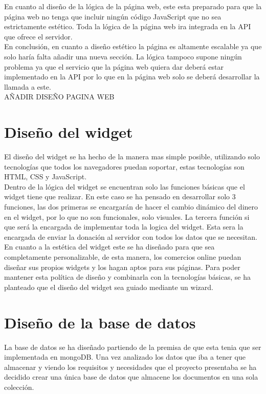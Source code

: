 En cuanto al diseño de la lógica de la página web, este esta preparado para que la página web no tenga que incluir ningún código JavaScript que no sea estrictamente estético. Toda la lógica de la página web ira integrada en la API que ofrece el servidor.\\

En conclusión, en cuanto a diseño estético la página es altamente escalable ya que solo haría falta añadir una nueva sección. La lógica tampoco supone ningún problema ya que el servicio que la página web quiera dar deberá estar implementado en la API por lo que en la página web solo se deberá desarrollar la llamada a este.\\

AÑADIR DISEÑO PAGINA WEB

\section{Diseño del widget}
El diseño del widget se ha hecho de la manera mas simple posible, utilizando solo tecnologías que todos los navegadores puedan soportar, estas tecnologías son HTML, CSS y JavaScript.\\

Dentro de la lógica del widget se encuentran solo las funciones básicas que el widget tiene que realizar. En este caso se ha pensado en desarrollar solo 3 funciones, las dos primeras se encargarán de hacer el cambio dinámico del dinero en el widget, por lo que no son funcionales, solo visuales. La tercera función si que será la encargada de implementar toda la logica del widget. Esta sera la encargada de enviar la donación al servidor con todos los datos que se necesitan.\\

En cuanto a la estética del widget este se ha diseñado para que sea completamente personalizable, de esta manera, los comercios online puedan diseñar sus propios widgets y los hagan aptos para sus páginas. Para poder mantener esta política de diseño y combinarla con la tecnologías básicas, se ha planteado que el diseño del widget sea guiado mediante un wizard.

\section{Diseño de la base de datos}
La base de datos se ha diseñado partiendo de la premisa de que esta tenia que ser implementada en mongoDB. Una vez analizado los datos que iba a tener que almacenar y viendo los requisitos y necesidades que el proyecto presentaba se ha decidido crear una única base de datos que almacene los documentos en una sola colección.\\

